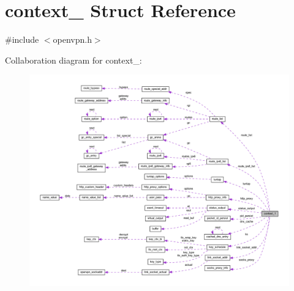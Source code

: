 \hypertarget{structcontext__1}{}\section{context\+\_ Struct Reference}
\label{structcontext__1}


{\ttfamily \#include $<$openvpn.\+h$>$}



Collaboration diagram for context\+\_\+:
\nopagebreak
\begin{figure}[H]
\begin{center}
\leavevmode
\includegraphics[width=350pt]{structcontext__1__coll__graph}
\end{center}
\end{figure}
